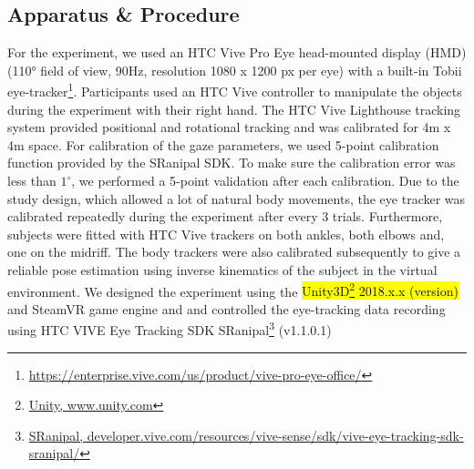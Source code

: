 \subsection{Apparatus \& Procedure}
For the experiment, we used an HTC Vive Pro Eye head-mounted display (HMD)(110° field of view, 90Hz, resolution 1080 x 1200 px per eye) with a built-in Tobii eye-tracker\footnote{\href{https://enterprise.vive.com/us/product/vive-pro-eye/}{https://enterprise.vive.com/us/product/vive-pro-eye-office/}}. Participants used an HTC Vive controller to manipulate the objects during the experiment with their right hand. The HTC Vive Lighthouse tracking system provided positional and rotational tracking and was calibrated for 4m x 4m space. For calibration of the gaze parameters, we used 5-point calibration function provided by the SRanipal SDK. To make sure the calibration error was less than $1^\circ$, we performed a 5-point validation after each calibration. Due to the study design, which allowed a lot of natural body movements, the eye tracker was calibrated repeatedly during the experiment after every 3 trials. Furthermore, subjects were fitted with HTC Vive trackers on both ankles, both elbows and, one on the midriff. The body trackers were also calibrated subsequently to give a reliable pose estimation using inverse kinematics of the subject in the virtual environment. We designed the experiment using the \hl{Unity3D\footnote{\href{www.unity.com}{Unity, www.unity.com}}  2018.x.x (version)} and SteamVR game engine and and controlled the eye-tracking data recording using HTC VIVE Eye Tracking SDK SRanipal\footnote{\href{https://developer.vive.com/resources/vive-sense/sdk/vive-eye-tracking-sdk-sranipal/}{SRanipal, developer.vive.com/resources/vive-sense/sdk/vive-eye-tracking-sdk-sranipal/}} (v1.1.0.1)
